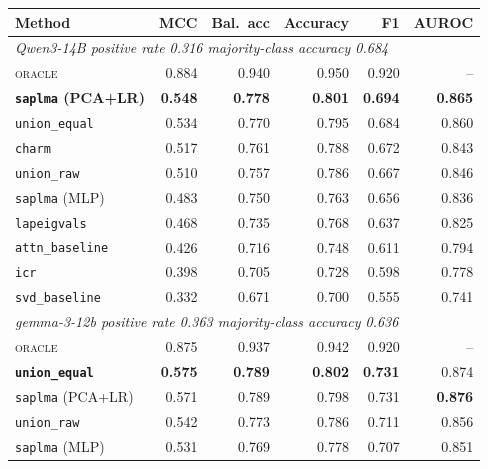 \begin{table}[t]
  \centering
  \small
  \setlength{\tabcolsep}{6pt}
  \begin{tabular}{l r r r r r}
    \toprule
    Method & MCC & Bal.\ acc & Accuracy & F1 & AUROC \\
    \midrule
    \multicolumn{6}{l}{\itshape Qwen3-14B \quad positive rate 0.316 \quad majority-class accuracy 0.684} \\
    \textsc{oracle}                & 0.884 & 0.940 & 0.950 & 0.920 & -- \\
    \textbf{\texttt{saplma} (PCA+LR)} & \textbf{0.548} & \textbf{0.778} & \textbf{0.801} & \textbf{0.694} & \textbf{0.865} \\
    \texttt{union\_equal}          & 0.534 & 0.770 & 0.795 & 0.684 & 0.860 \\
    \texttt{charm}                 & 0.517 & 0.761 & 0.788 & 0.672 & 0.843 \\
    \texttt{union\_raw}            & 0.510 & 0.757 & 0.786 & 0.667 & 0.846 \\
    \texttt{saplma} (MLP)          & 0.483 & 0.750 & 0.763 & 0.656 & 0.836 \\
    \texttt{lapeigvals}            & 0.468 & 0.735 & 0.768 & 0.637 & 0.825 \\
    \texttt{attn\_baseline}        & 0.426 & 0.716 & 0.748 & 0.611 & 0.794 \\
    \texttt{icr}                   & 0.398 & 0.705 & 0.728 & 0.598 & 0.778 \\
    \texttt{svd\_baseline}         & 0.332 & 0.671 & 0.700 & 0.555 & 0.741 \\
    \midrule
    \multicolumn{6}{l}{\itshape gemma-3-12b \quad positive rate 0.363 \quad majority-class accuracy 0.636} \\
    \textsc{oracle}                & 0.875 & 0.937 & 0.942 & 0.920 & -- \\
    \textbf{\texttt{union\_equal}} & \textbf{0.575} & \textbf{0.789} & \textbf{0.802} & \textbf{0.731} & 0.874 \\
    \texttt{saplma} (PCA+LR)       & 0.571 & 0.789 & 0.798 & 0.731 & \textbf{0.876} \\
    \texttt{union\_raw}            & 0.542 & 0.773 & 0.786 & 0.711 & 0.856 \\
    \texttt{saplma} (MLP)          & 0.531 & 0.769 & 0.778 & 0.707 & 0.851 \\

\end{tabular}
\end{table}
